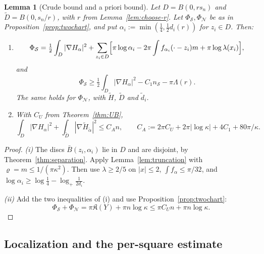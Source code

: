 \documentclass[11pt]{article}
\newtheorem{lemma}[theorem]{Lemma}
\theoremstyle{definition}
\theoremstyle{remark}
\begin{document}
\begin{lemma}[Crude bound and a priori bound]\label{lem:apriori}
Let $D=B(0,rs_n)$ and $\tilde D=B(0,s_n/r)$, with $r$ from Lemma~\ref{lem:choose-r}. Let
$\Phi_{\mathcal S},\Phi_{\mathcal N}$ be as in Proposition~\ref{prop:twochart}, and put
$\alpha_i:=\min(\tfrac14,\tfrac12d_i(r))$ for $z_i\in D$. Then:
\begin{enumerate}[label=(\roman*)]
\item
\[
\Phi_{\mathcal S}=\tfrac12\int_D|\nabla H_\alpha|^2+\sum_{z_i\in D}\Bigl[\pi\log\alpha_i-2\pi\int f_{\alpha_i}(\cdot-z_i)m+\pi\log\lambda(x_i)\Bigr],
\]
and
\[
\Phi_{\mathcal S}\ge\tfrac12\int_D|\nabla H_\alpha|^2-C_1n_{\mathcal S}-\pi\Lambda(r).
\]
The same holds for $\Phi_{\mathcal N}$, with $\tilde H$, $\tilde D$ and $\tilde d_i$.
\item With $C_U$ from Theorem~\ref{thm:UB},
\[
\int_D|\nabla H_\alpha|^2+\int_{\tilde D}|\nabla\tilde H_{\tilde\alpha}|^2\le C_An,
\qquad C_A:=2\pi C_U+2\pi|\log\kappa|+4C_1+80\pi/\kappa .
\]
\end{enumerate}
\end{lemma}
\begin{proof}
\emph{(i)} The discs $\bar B(z_i,\alpha_i)$ lie in $D$ and are disjoint, by
Theorem~\ref{thm:separation}. Apply Lemma~\ref{lem:truncation} with $\varrho=m\le1/(\pi\kappa^2)$.
Then use $\lambda\ge2/5$ on $|x|\le2$, $\int f_\alpha\le\pi/32$, and
$\log\alpha_i\ge\log\tfrac14-\log_+\frac1{2d_i}$.

\emph{(ii)} Add the two inequalities of (i) and use Proposition~\ref{prop:twochart}:
\[
\Phi_{\mathcal S}+\Phi_{\mathcal N}=\pi\mathfrak K(Y)+\pi n\log\kappa\le\pi C_Un+\pi n\log\kappa .
\]
\end{proof}

\subsection{Localization and the per-square estimate}
\end{document}
